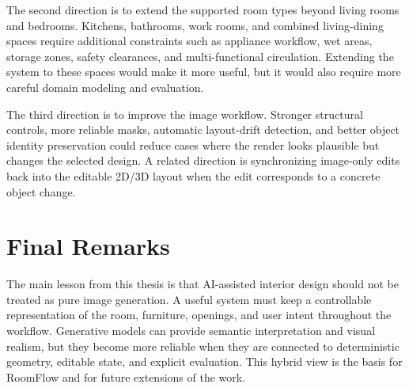 The second direction is to extend the supported room types beyond living rooms and bedrooms. Kitchens, bathrooms, work rooms, and combined living-dining spaces require additional constraints such as appliance workflow, wet areas, storage zones, safety clearances, and multi-functional circulation. Extending the system to these spaces would make it more useful, but it would also require more careful domain modeling and evaluation.

The third direction is to improve the image workflow. Stronger structural controls, more reliable masks, automatic layout-drift detection, and better object identity preservation could reduce cases where the render looks plausible but changes the selected design. A related direction is synchronizing image-only edits back into the editable 2D/3D layout when the edit corresponds to a concrete object change.

\section{Final Remarks}\label{sec:final-remarks}

The main lesson from this thesis is that AI-assisted interior design should not be treated as pure image generation. A useful system must keep a controllable representation of the room, furniture, openings, and user intent throughout the workflow. Generative models can provide semantic interpretation and visual realism, but they become more reliable when they are connected to deterministic geometry, editable state, and explicit evaluation. This hybrid view is the basis for RoomFlow and for future extensions of the work.
